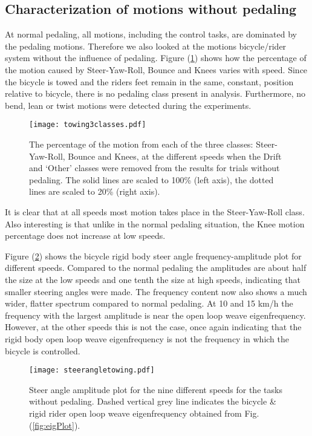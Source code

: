\subsection{Characterization of motions without pedaling}
\label{sec:noPed}
At normal pedaling, all motions, including the control tasks, are dominated by the pedaling motions. Therefore we also looked at the motions bicycle/rider system without the influence of pedaling. Figure (\ref{missjellybean}) shows how the percentage of the motion caused by Steer-Yaw-Roll, Bounce and Knees varies with speed. Since the bicycle is towed and the riders feet remain in the same, constant, position relative to bicycle, there is no pedaling class present in analysis. Furthermore, no bend, lean or twist motions were detected during the experiments.
\begin{figure}[tb]
    \centering
        \texttt{[image: towing3classes.pdf]}\\
    \caption{The percentage of the motion from each of the three classes: Steer-Yaw-Roll, Bounce and Knees, at the different speeds when the Drift and `Other' classes were removed from the results for trials without pedaling. The solid lines are scaled to 100\% (left axis), the dotted lines are scaled to 20\% (right axis).}
    \label{missjellybean}
\end{figure}

It is clear that at all speeds most motion takes place in the Steer-Yaw-Roll class. Also interesting is that unlike in the normal pedaling situation, the Knee motion percentage does not increase at low speeds.

Figure (\ref{towingsteerangle}) shows the bicycle rigid body steer angle frequency-amplitude plot for different speeds. Compared to the normal pedaling the amplitudes are about half the size at the low speeds and one tenth the size at high speeds, indicating that smaller steering angles were made. The frequency content now also shows a much wider, flatter spectrum compared to normal pedaling. At 10 and 15 km/h the frequency with the largest amplitude is near the open loop weave eigenfrequency. However, at the other speeds this is not the case, once again indicating that the rigid body open loop weave eigenfrequency is not the frequency in which the bicycle is controlled.
\begin{figure}[]
    \centering
        \texttt{[image: steerangletowing.pdf]}\\
    \caption{Steer angle amplitude plot for the nine different speeds for the tasks without pedaling. Dashed vertical grey line indicates the bicycle \& rigid rider open loop weave eigenfrequency obtained from Fig. (\ref{fig:eigPlot}).}
    \label{towingsteerangle}
\end{figure}


